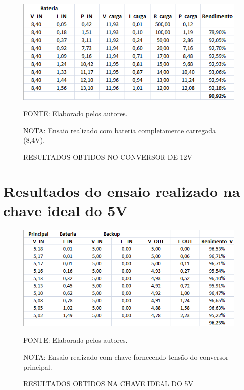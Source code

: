 \documentclass[
	12pt,				%
	openright,			%
	oneside,			%
	a4paper,			%
	english,			%
	french,				%
	spanish,			%
	brazil,				%
	oldfontcommands
	]{abntex2}
\begin{document}
\begin{apendicesenv}
	\begin{figure}[th]
		\caption{RESULTADOS OBTIDOS NO CONVERSOR DE 12V}
		\centering
		\includegraphics[width=0.75\linewidth]{./anexos/rend12_3}
		
		\begin{small}
			FONTE: Elaborado pelos autores.
		\end{small}	
		
		\begin{footnotesize}
		NOTA: Ensaio realizado com bateria completamente carregada (8,4V).
		\end{footnotesize}
	\end{figure}	
	
\chapter[Resultados do ensaio realizado na chave ideal do 5V]{Resultados do ensaio realizado na chave ideal do 5V}\label{An_rendch5}

	\begin{figure}[th]
		\caption{RESULTADOS OBTIDOS NA CHAVE IDEAL DO 5V}
		\centering
		\includegraphics[width=0.75\linewidth]{./anexos/chavep}
		
		\begin{small}
			FONTE: Elaborado pelos autores.
		\end{small}	
		
		\begin{footnotesize}
		NOTA: Ensaio realizado com chave fornecendo tensão do conversor principal.
		\end{footnotesize}
	\end{figure}
	

\end{apendicesenv}
\end{document}
